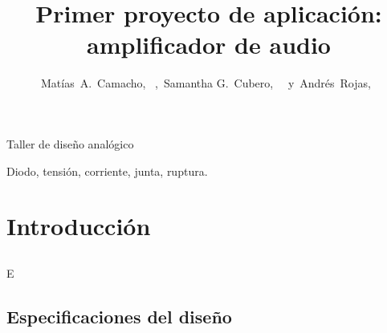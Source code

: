 \documentclass[journal, onecolumn]{IEEEtran}
\begin{document}
%
\title{Primer proyecto de aplicación: amplificador de audio}


\author{Matías~A.~Camacho,~
        ,~Samantha G.~Cubero,~
        ~y~Andrés~Rojas,~
}

%
{Taller de diseño analógico}


\maketitle




\clearpage
\tableofcontents
\clearpage

\begin{IEEEkeywords}
Diodo, tensión, corriente, junta, ruptura.
\end{IEEEkeywords}


\section{Introducción}


\subsection{}
E
\subsection{}



\subsection{Especificaciones del diseño}
\end{document}
